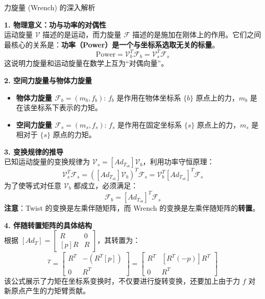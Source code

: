 \begin{mybox}{力旋量 (Wrench) 的深入解析}

\textbf{1. 物理意义：功与功率的对偶性} \\
运动旋量 $\mathcal{V}$ 描述的是运动，而力旋量 $\mathcal{F}$ 描述的是施加在刚体上的作用。它们之间最核心的关系是：\textbf{功率（Power）是一个与坐标系选取无关的标量}。
\begin{equation}
    \text{Power} = \mathcal{V}_b^T \mathcal{F}_b = \mathcal{V}_s^T \mathcal{F}_s
\end{equation}
这说明力旋量和运动旋量在数学上互为“对偶向量”。

\textbf{2. 空间力旋量与物体力旋量} \\
\begin{itemize}
    \item \textbf{物体力旋量 $\mathcal{F}_b = (m_b, f_b)$}:
    $f_b$ 是作用在物体坐标系 $\{b\}$ 原点上的力，$m_b$ 是在该坐标系下表示的力矩。
    \item \textbf{空间力旋量 $\mathcal{F}_s = (m_s, f_s)$}:
    $f_s$ 是作用在固定坐标系 $\{s\}$ 原点上的力，$m_s$ 是相对于 $\{s\}$ 原点的力矩。
\end{itemize}



\textbf{3. 变换规律的推导} \\
已知运动旋量的变换规律为 $\mathcal{V}_s = [Ad_{T_{sb}}] \mathcal{V}_b$，利用功率守恒原理：
\begin{equation}
    \mathcal{V}_s^T \mathcal{F}_s = ([Ad_{T_{sb}}] \mathcal{V}_b)^T \mathcal{F}_s = \mathcal{V}_b^T [Ad_{T_{sb}}]^T \mathcal{F}_s
\end{equation}
为了使等式对任意 $\mathcal{V}_b$ 都成立，必须满足：
\begin{equation}
    \mathcal{F}_b = [Ad_{T_{sb}}]^T \mathcal{F}_s
\end{equation}
\textbf{注意}：Twist 的变换是左乘伴随矩阵，而 Wrench 的变换是左乘伴随矩阵的\textbf{转置}。

\textbf{4. 伴随转置矩阵的具体结构} \\
根据 $[Ad_T] = \begin{bmatrix} R & 0 \\ [p]R & R \end{bmatrix}$，其转置为：
\begin{equation}
    [Ad_T]^T = \begin{bmatrix} R^T & -(R^T[p]) \\ 0 & R^T \end{bmatrix} = \begin{bmatrix} R^T & [R^T(-p)]R^T \\ 0 & R^T \end{bmatrix}
\end{equation}
该公式展示了力矩在坐标系变换时，不仅要进行旋转变换，还要加上由于力 $f$ 对新原点产生的力矩臂贡献。

\end{mybox}